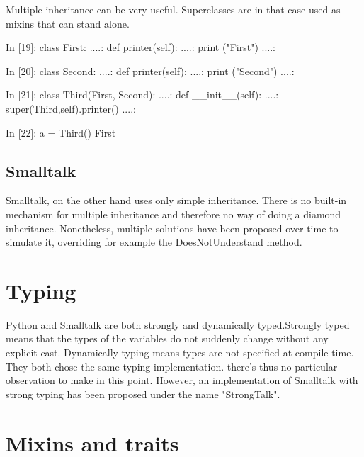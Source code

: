 \documentclass[12pt,a4paper]{scrartcl}
\begin{document}
\begin{multicols}{2}
Multiple inheritance can be very useful. Superclasses are in that case used as mixins that can stand alone.


\begin{python}
In [19]: class First:
   ....:       def printer(self):
   ....:             print ("First")
   ....:         

In [20]: class Second:
   ....:       def printer(self):
   ....:             print ("Second")
   ....:         

In [21]: class Third(First, Second):
   ....:       def __init__(self):
   ....:             super(Third,self).printer()
   ....:         

In [22]: a = Third()
First

\end{python}

\subsection{Smalltalk}
Smalltalk, on the other hand uses only simple inheritance. There is no built-in mechanism for multiple inheritance and therefore no way of doing a diamond inheritance. Nonetheless, multiple solutions have been proposed over time to simulate it, overriding for example the DoesNotUnderstand method.








\section{Typing}
Python and Smalltalk are both strongly and dynamically typed.Strongly typed means that the types of the variables do not suddenly change without any explicit cast. 
Dynamically typing means types are not specified at compile time.
They both chose the same typing implementation. there's thus no particular observation to make in this point. However, an implementation of Smalltalk with strong typing has been proposed under the name "StrongTalk".



\section{Mixins and traits}

\end{multicols}
\end{document}
